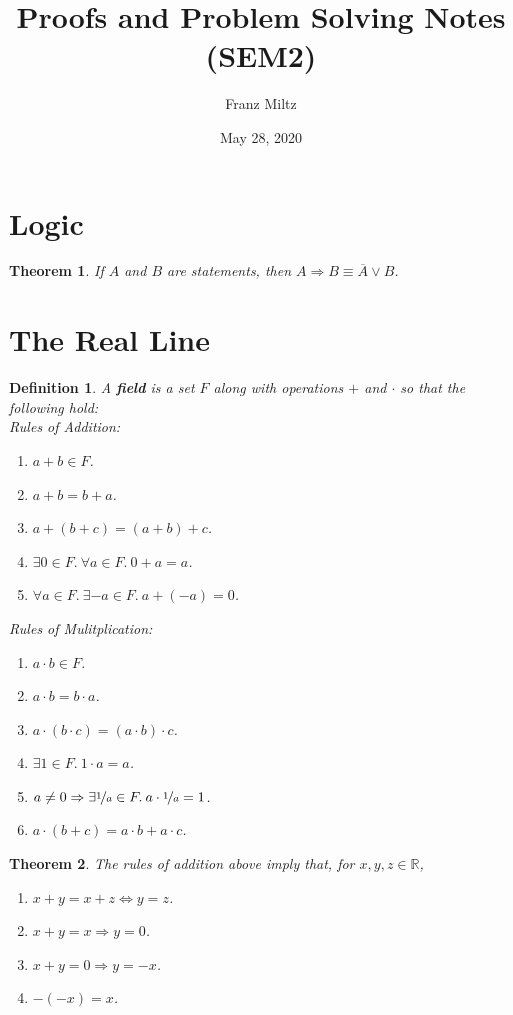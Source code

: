 \documentclass{article}
\theoremstyle{sltheorem}
\newtheorem{definition}{Definition}[section]
\newtheorem{theorem}{Theorem}[section]
\newcommand{\R}{\mathbb{R}}
\newcommand*\lneg[1]{\overline{#1}}
\newcommand*\B[1]{\textbf{#1}}
\begin{document}
\title{Proofs and Problem Solving Notes (SEM2)}
\author{Franz Miltz}
\date{May 28, 2020}
\maketitle
\tableofcontents
\pagebreak
\section{Logic}
\begin{theorem}
    If $A$ and $B$ are statements, then $A\Rightarrow B\equiv \lneg{A}\vee B$.
\end{theorem}
\section{The Real Line}
\begin{definition}
    A \B{field} is a set $F$ along with operations $+$ and $\cdot$ so that the following hold:\\
    Rules of Addition:
    \begin{enumerate}
        \item $a+b\in F$.
        \item $a+b = b+a$.
        \item $a+(b+c) = (a+b)+c$.
        \item $\exists 0\in F.\: \forall a\in F.\: 0+a=a$.
        \item $\forall a\in F.\: \exists -a\in F.\: a+(-a)=0$.
    \end{enumerate}
    Rules of Mulitplication:
    \begin{enumerate}
        \item $a\cdot b \in F$.
        \item $a\cdot b = b\cdot a$.
        \item $a\cdot(b\cdot c)=(a\cdot b)\cdot c$.
        \item $\exists 1\in F.\: 1\cdot a = a$.
        \item $a\not=0\Rightarrow\exists \nicefrac{1}{a}\in F.\: a\cdot\nicefrac{1}{a}=1$.
        \item $a\cdot (b+c) = a\cdot b + a\cdot c$.
    \end{enumerate}
\end{definition}
\begin{theorem}
    The rules of addition above imply that, for $x,y,z\in \R$,
    \begin{enumerate}
        \item $x+y=x+z\Leftrightarrow y=z$.
        \item $x+y=x\Rightarrow y=0$.
        \item $x+y=0\Rightarrow y=-x$.
        \item $-(-x)=x$.
    \end{enumerate}
\end{theorem}
\end{document}
